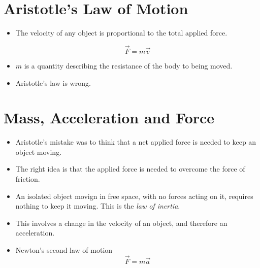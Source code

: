 \documentclass[../main.tex]{subfiles}
\begin{document}
\section{Aristotle's Law of Motion}

\begin{itemize}
    \item The velocity of any object is proportional to the total applied
        force.

        \begin{equation}
            \vec{F} = m \vec{v}
        \end{equation}

    \item $m$ is a quantity describing the resistance of the body to being
        moved.

    \item Aristotle's law is wrong.
\end{itemize}

\section{Mass, Acceleration and Force}

\begin{itemize}

    \item Aristotle's mistake was to think that a net applied force is needed
        to keep an object moving.

    \item The right idea is that the applied force is needed to overcome the force of friction.
        
    \item An isolated object movign in free space, with no forces acting on it,
        requires nothing to keep it moving. This is the \textit{law of
        inertia}.

    \item This involves a change in the velocity of an object, and therefore an
        acceleration. 

    \item Newton's second law of motion
        \begin{equation}
            \vec{F} = m\vec{a}
        \end{equation}

\end{itemize}
\end{document}

